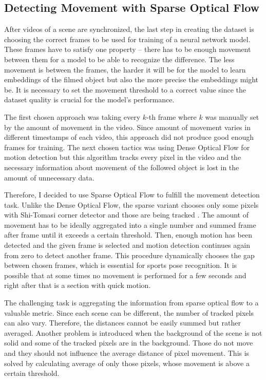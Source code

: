 \subsection{Detecting Movement with Sparse Optical Flow}

After videos of a scene are synchronized, the last step in creating the dataset is choosing the correct frames to be used for training of a neural network model. These frames have to satisfy one property -- there has to be enough movement between them for a model to be able to recognize the difference. The less movement is between the frames, the harder it will be for the model to learn embeddings of the filmed object but also the more precise the embeddings might be. It is necessary to set the movement threshold to a correct value since the dataset quality is crucial for the model's performance.

The first chosen approach was taking every $k$-th frame where $k$ was manually set by the amount of movement in the video. Since amount of movement varies in different timestamps of each video, this approach did not produce good enough frames for training. The next chosen tactics was using Dense Optical Flow for motion detection but this algorithm tracks every pixel in the video and the necessary information about movement of the followed object is lost in the amount of unnecessary data.

Therefore, I decided to use Sparse Optical Flow to fulfill the movement detection task. Unlike the Dense Optical Flow, the sparse variant chooses only some pixels with Shi-Tomasi corner detector and those are being tracked \cite{shi-tomasi-323794}. The amount of movement has to be ideally aggregated into a single number and summed frame after frame until it exceeds a certain threshold. Then, enough motion has been detected and the given frame is selected and motion detection continues again from zero to detect another frame. This procedure dynamically chooses the gap between chosen frames, which is essential for sports pose recognition. It is possible that at some times no movement is performed for a few seconds and right after that is a section with quick motion.

The challenging task is aggregating the information from sparse optical flow to a valuable metric. Since each scene can be different, the number of tracked pixels can also vary. Therefore, the distances cannot be easily summed but rather averaged. Another problem is introduced when the background of the scene is not solid and some of the tracked pixels are in the background. Those do not move and they should not influence the average distance of pixel movement. This is solved by calculating average of only those pixels, whose movement is above a certain threshold.

